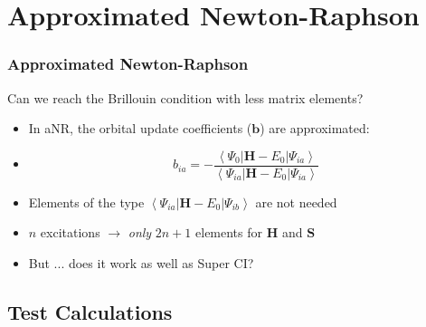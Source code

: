 \documentclass[]{beamer}
\begin{document}
\section{Approximated Newton-Raphson}

\begin{frame}
  \frametitle{Approximated Newton-Raphson}
  Can we reach the Brillouin condition with less matrix elements?
  \begin{itemize}
    \item \alert<+> {In aNR, the orbital update coefficients ($\mathbf{b}$) are approximated:}
    \item \alert<+> {\begin{equation*}b_{ia} = -\frac{\left< \Psi_0 | \mathbf{H} - E_0 | \Psi_{ia} \right>}{\left< \Psi_{ia} | \mathbf{H} - E_0 | \Psi_{ia} \right>}\end{equation*}}
    \item \alert<+> {Elements of the type $\left< \Psi_{ia} | \mathbf{H} - E_0 | \Psi_{ib} \right>$ are not needed}
    \item \alert<+> {$n$ excitations $\rightarrow$ \textit{only} $2n+1$ elements for $\mathbf{H}$ and $\mathbf{S}$}
    \item \alert<+> {But ... does it work as well as Super CI?}
  \end{itemize}
\end{frame}

\subsection{Test Calculations}
\end{document}
